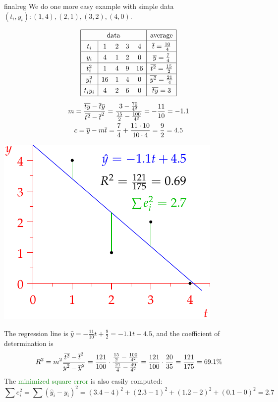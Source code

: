 \begin{example}{}{finalreg}
	We do one more easy example with simple data $(t_i,y_i):(1,4),(2,1),(3,2),(4,0)$.\par
	\begin{minipage}[t]{0.55\linewidth}\vspace{-10pt}
		\begin{gather*}\renewcommand{\arraystretch}{1.3}
			\begin{array}{|c|cccc|c|}
				\hline
				\multicolumn{5}{|c|}{\text{data}}&\text{average}\\\hline
				t_i&1&2&3&4&\cl t=\frac{10}4\\\hline
				y_i&4&1&2&0&\cl y=\frac 74\\\hline
				t_i^2&1&4&9&16&\cl{t^2}=\frac{15}2\\\hline
				y_i^2&16&1&4&0&\cl{y^2}=\frac{21}4\\\hline
				t_iy_i&4&2&6&0&\cl{ty}=3\\\hline
			\end{array}\\[5pt]
			m=\frac{\cl{ty}-\cl t\cl y}{\cl{t^2}-\cl t^2} =\frac{3-\frac{70}{4^2}}{\frac{15}2-\frac{100}{4^2}} =-\frac{11}{10}=-1.1\\
			c=\cl y-m\cl t=\frac{7}4+\frac{11\cdot 10}{10\cdot 4}=\frac 92 =4.5
		\end{gather*}
\end{minipage}
\hfill
\begin{minipage}[t]{0.44\linewidth}\vspace{0pt}
	\flushright\includegraphics{reg-line5}
\end{minipage}\medbreak
The regression line is $\hat y=-\frac{11}{10}t+\frac 92=-1.1t+4.5$, and the coefficient of determination is
\[
	R^2=m^2\frac{\overline{t^2}-\overline{t}^2}{\overline{y^2}-\overline{y}^2} =\frac{121}{100}\cdot \frac{\frac{15}2-\frac{100}{4^2}}{\frac{21}4-\frac{49}{4^2}}= \frac{121}{100}\cdot \frac{20}{35} =\frac{121}{175} =69.1\%
\]
The \textcolor{Green}{minimized square error} is also easily computed:
\[
	\sum e_i^2=\sum(\hat y_i-y_i)^2=(3.4-4)^2+(2.3-1)^2+(1.2-2)^2+(0.1-0)^2=2.7
\] 
\end{example}


